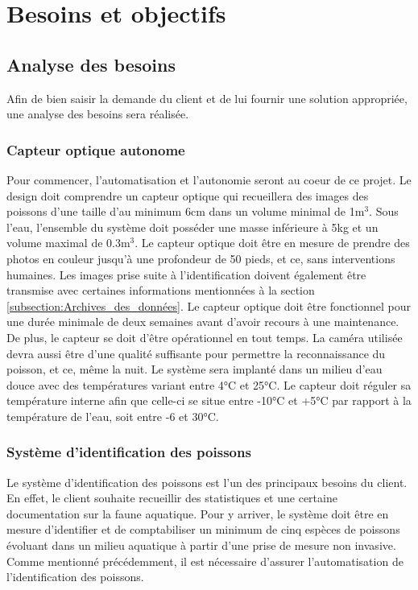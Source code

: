
%
%

\chapter{Besoins et objectifs}
\label{s:objectifs}

\section{Analyse des besoins}

Afin de bien saisir la demande du client et de lui fournir une solution appropriée, une analyse des besoins sera réalisée. 

\subsection{Capteur optique autonome}

Pour commencer, l'automatisation et l'autonomie seront au coeur de ce projet. Le design doit comprendre un capteur optique qui recueillera des images des poissons d'une taille d'au minimum 6cm dans un volume minimal de 1m$^3$. Sous l'eau, l'ensemble du système doit posséder une masse inférieure à 5kg et un volume maximal de 0.3m$^3$. Le capteur optique doit être en mesure de prendre des photos en couleur jusqu'à une profondeur de 50 pieds, et ce, sans interventions humaines. Les images prise suite à l'identification doivent également être transmise avec certaines informations mentionnées à la section \ref{subsection:Archives_des_données}. Le capteur optique doit être fonctionnel pour une durée minimale de deux semaines avant d'avoir recours à une maintenance. De plus, le capteur se doit d'être opérationnel en tout temps. La caméra utilisée devra aussi être d'une qualité suffisante pour permettre la reconnaissance du poisson, et ce, même la nuit. Le système sera implanté dans un milieu d'eau douce avec des températures variant entre 4°C et 25°C. Le capteur doit réguler sa température interne afin que celle-ci se situe entre -10°C et +5°C par rapport à la température de l'eau, soit entre -6 et 30°C. 

\subsection{Système d'identification des poissons}

Le système d'identification des poissons est l'un des principaux besoins du client. En effet, le client souhaite recueillir des statistiques et une certaine documentation sur la faune aquatique. Pour y arriver, le système doit être en mesure d'identifier et de comptabiliser un minimum de cinq espèces de poissons évoluant dans un milieu aquatique à partir d'une prise de mesure non invasive. Comme mentionné précédemment, il est nécessaire d'assurer l'automatisation de l'identification des poissons.

